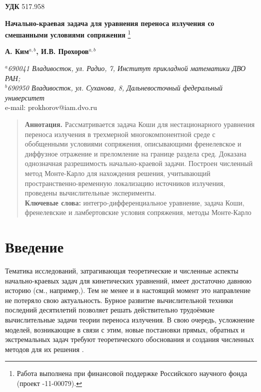 \documentclass[12pt,reqno]{report}
\begin{document}
	
	
	
	{\bf УДК} 517.958 \vskip0.2cm
	
	
	\begin{center}
		{\bf \large Начально-краевая
			задача для уравнения переноса излучения 
			со смешанными  
			условиями сопряжения }\footnote[1]{Работа выполнена при финансовой
			поддержке Российского научного фонда (проект -11-00079).}
	\end{center}
	\begin{center}
		{\bf А. Ким$^{a,b}$, И.В. Прохоров$^{a,b}$ }
	\end{center}
	\begin{center}
		{\it ${}^a$690041 Владивосток, ул. Радио, 7, Институт прикладной
			математики ДВО РАН; \\ ${}^b$690950 Владивосток, ул. Суханова, 8,
			Дальневосточный федеральный университет}\\
		e-mail: prokhorov@iam.dvo.ru
	\end{center}
	\begin{quote}
		{\bf Аннотация.} Рассматривается задача Коши для нестационарного
		уравнения переноса излучения в трехмерной многокомпонентной среде
		с обобщенными условиями сопряжения, описывающими френелевское и диффузное
		отражение и преломление на границе раздела сред. Доказана
		однозначная разрешимость начально-краевой задачи. Построен численный метод Монте-Карло для
		нахождения решения, учитывающий пространственно-временную локализацию источников излучения, проведены вычислительные
		эксперименты.\\
		{\bf Ключевые слова:} интегро-дифференциальное уравнение,
		 задача Коши, френелевские и ламбертовские  условия
		сопряжения, методы Монте-Карло
	\end{quote}
	
	\section{Введение}
	
	\setcounter{equation}{0}
	\setcounter{definition}{0}\setcounter{lemma}{0}\setcounter{theorem}{0}
	\setcounter{corollary}{0}\setcounter{remark}{0}
	
	
Тематика исследований, затрагивающая  теоретические и численные  аспекты   начально-краевых задач для  кинетических уравнений, имеет достаточно давнюю историю (см., например,\cite{1,2,3,4,5}). Тем не менее и в настоящий момент это направление не потеряло свою актуальность. Бурное развитие вычислительной техники последний десятилетий позволяет решать действительно трудоёмкие вычислительные задачи теории переноса излучения. В свою очередь, усложнение моделей, возникающие в связи с этим, новые постановки прямых, обратных и экстремальных задач требуют теоретического обоснования и  создания численных методов для их решения \cite{6,7,8,9,10,11,12,13,14,15,16,17,18}.
\end{document}
